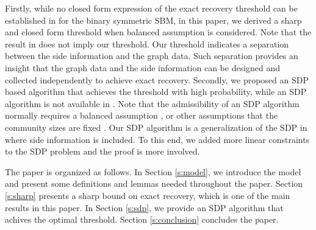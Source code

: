 \documentclass[conference]{IEEEtran}
\begin{document}
	Firstly, while no closed form expression of the exact recovery threshold can be established in \cite{abbe17sideinfo} for  the binary symmetric SBM, in this paper, we derived a sharp and closed form threshold when balanced assumption is considered. Note that the result in \cite{abbe17sideinfo} does not imply our threshold. Our threshold indicates a separation between the side information and the graph data. Such separation provides an insight that the graph data and the side information can be designed and collected independently to achieve exact recovery. 
	Secondly, we proposed an SDP based algorithm that achieves the threshold with high probability, while an SDP algorithm is not available in \cite{abbe17sideinfo}. Note that the admissibility of an SDP algorithm normally requires a balanced assumption \cite{abbe2015exact},
	\cite{esmaeili2019community} or other assumptions that the community sizes are fixed \cite{Hajek16}. Our SDP algorithm is a generalization of the SDP in \cite{abbe2015exact} where side information is included. To this end, we added more linear constraints to the SDP problem and the proof is more involved.
	
	The paper is organized as follows. 
	In Section \ref{s:model}, we introduce the model and present some definitions and lemmas needed throughout the paper. Section \ref{s:sharp} presents a sharp bound on exact recovery, which is one of the main results in this paper. In Section \ref{s:sdp}, we provide an SDP algorithm that achives the optimal threshold. Section \ref{s:conclusion} concludes the paper.
	
\end{document}
